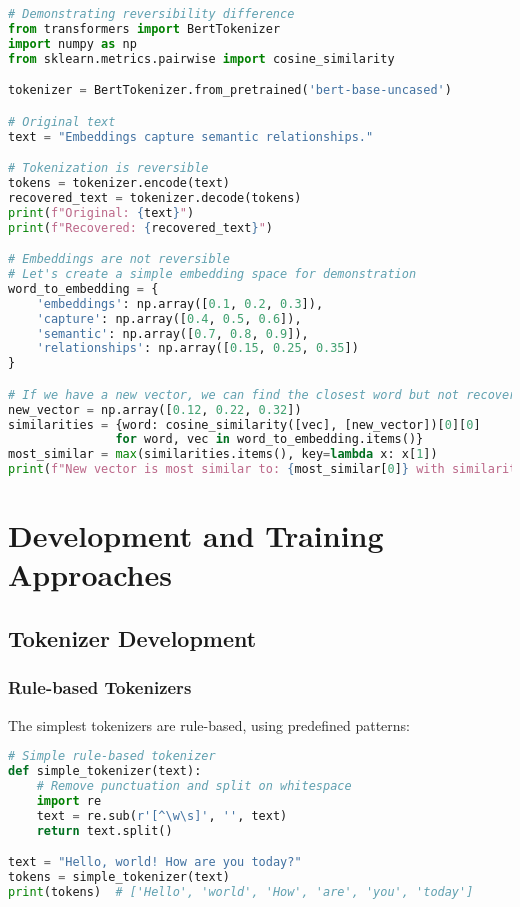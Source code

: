 \documentclass{article}
\begin{document}
\begin{lstlisting}[language=Python]
# Demonstrating reversibility difference
from transformers import BertTokenizer
import numpy as np
from sklearn.metrics.pairwise import cosine_similarity

tokenizer = BertTokenizer.from_pretrained('bert-base-uncased')

# Original text
text = "Embeddings capture semantic relationships."

# Tokenization is reversible
tokens = tokenizer.encode(text)
recovered_text = tokenizer.decode(tokens)
print(f"Original: {text}")
print(f"Recovered: {recovered_text}")

# Embeddings are not reversible
# Let's create a simple embedding space for demonstration
word_to_embedding = {
    'embeddings': np.array([0.1, 0.2, 0.3]),
    'capture': np.array([0.4, 0.5, 0.6]),
    'semantic': np.array([0.7, 0.8, 0.9]),
    'relationships': np.array([0.15, 0.25, 0.35])
}

# If we have a new vector, we can find the closest word but not recover exactly
new_vector = np.array([0.12, 0.22, 0.32])
similarities = {word: cosine_similarity([vec], [new_vector])[0][0] 
               for word, vec in word_to_embedding.items()}
most_similar = max(similarities.items(), key=lambda x: x[1])
print(f"New vector is most similar to: {most_similar[0]} with similarity {most_similar[1]:.4f}")
\end{lstlisting}

\section{Development and Training Approaches}
\subsection{Tokenizer Development}
\subsubsection{Rule-based Tokenizers}
The simplest tokenizers are rule-based, using predefined patterns:

\begin{lstlisting}[language=Python]
# Simple rule-based tokenizer
def simple_tokenizer(text):
    # Remove punctuation and split on whitespace
    import re
    text = re.sub(r'[^\w\s]', '', text)
    return text.split()

text = "Hello, world! How are you today?"
tokens = simple_tokenizer(text)
print(tokens)  # ['Hello', 'world', 'How', 'are', 'you', 'today']
\end{lstlisting}
\end{document}
